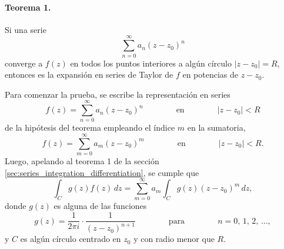 \documentclass[a4paper]{report}
\begin{document}
\paragraph{Teorema 1.} Si una serie
\begin{equation}\label{eq:power_series_generic_definition_tmp5}
 \sum_{n=0}^\infty a_n(z-z_0)^n 
\end{equation}
converge a \(f(z)\) en todos los puntos interiores a algún círculo \(|z-z_0|=R\), entonces es la expansión en series de Taylor de \(f\) en potencias de \(z-z_0\).

Para comenzar la prueba, se escribe la representación en series 
\begin{equation}\label{eq:series_unicity_proof_tmp1}
 f(z)=\sum_{n=0}^\infty a_n(z-z_0)^n 
 \qquad\qquad\textrm{en}\qquad\qquad
 |z-z_0|<R
\end{equation}
de la hipótesis del teorema empleando el índice \(m\) en la sumatoria,
\[
 f(z)=\sum_{m=0}^\infty a_m(z-z_0)^m 
 \qquad\qquad\textrm{en}\qquad\qquad
 |z-z_0|<R.
\]
Luego, apelando al teorema 1 de la sección \ref{sec:series_integration_differentiation}, se cumple que 
\begin{equation}\label{eq:series_unicity_proof_tmp2}
 \int_C g(z)f(z)\,dz=\sum_{m=0}^\infty a_m\int_C g(z)(z-z_0)^m\,dz, 
\end{equation}
donde \(g(z)\) es alguna de las funciones
\begin{equation}\label{eq:series_unicity_proof_tmp_g}
 g(z)=\frac{1}{2\pi i}\cdot\frac{1}{(z-z_0)^{n+1}}
 \qquad\qquad\textrm{para}\qquad\qquad
 n=0,\,1,\,2,\,\dots, 
\end{equation}
y \(C\) es algún círculo centrado en \(z_0\) y con radio menor que \(R\).
\end{document}
